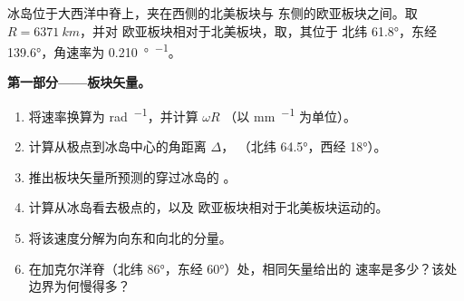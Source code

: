 \begin{problem}
\label{pb:b1:plate-kinematics:1}
冰岛位于大西洋中脊上，夹在西侧的北美板块与
东侧的欧亚板块之间。取 $R = \qty{6371}{km}$，并对
欧亚板块相对于北美板块，取，其位于
北纬 \ang{61.8}，东经 \ang{139.6}，角速率为 \qty{0.210}{\degree\per\Ma}。

\medskip
\noindent\textbf{第一部分——板块矢量。}
\begin{enumerate}
  \item 将速率换算为 \unit{rad.^{-1}}，并计算 $\omega R$
        （以 \unit{mm.^{-1}} 为单位）。
  \item 计算从极点到冰岛中心的角距离 $\Delta$，
        （北纬 \ang{64.5}，西经 \ang{18}）。
  \item 推出板块矢量所预测的穿过冰岛的
        。
  \item 计算从冰岛看去极点的，以及
        欧亚板块相对于北美板块运动的。
  \item 将该速度分解为向东和向北的分量。
  \item 在加克尔洋脊（北纬 \ang{86}，东经 \ang{60}）处，相同矢量给出的
        速率是多少？该处边界为何慢得多？
\end{enumerate}


\end{problem}

